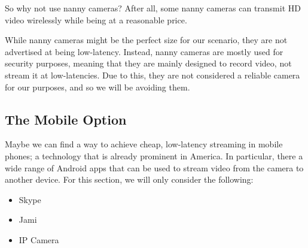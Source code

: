 So why not use nanny cameras? After all, some nanny cameras \cite{nannyCam} can transmit HD video wirelessly while being at a reasonable price.

While nanny cameras might be the perfect size for our scenario, they are not advertised at being low-latency. Instead, nanny cameras are mostly used for security purposes, meaning that they are mainly designed to record video, not stream it at low-latencies. Due to this, they are not considered a reliable camera for our purposes, and so we will be avoiding them.


\subsection{The Mobile Option}

Maybe we can find a way to achieve cheap, low-latency streaming in mobile phones; a technology that is already prominent in America. In particular, there a wide range of Android apps that can be used to stream video from the camera to another device. For this section, we will only consider the following:

\begin{itemize}
\item Skype
\item Jami
\item IP Camera

\end{itemize}
